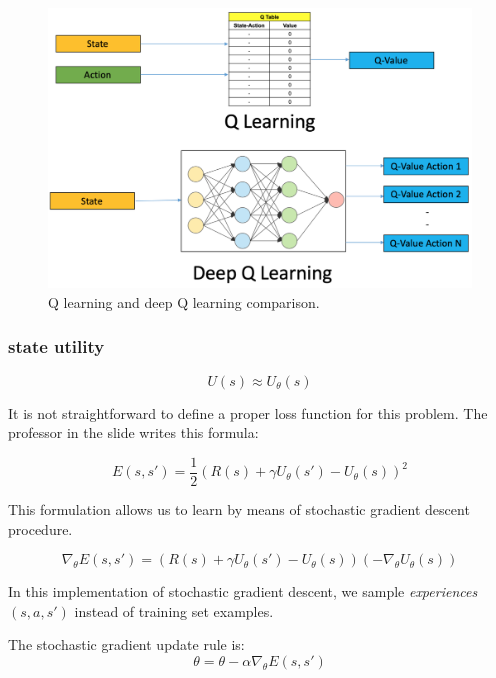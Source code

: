 \begin{figure}[H]
    \centering
    \includegraphics[width=\textwidth]{images/deepQLearning.png}
    \caption{Q learning and deep Q learning comparison.}
    \label{fig:reinforcementLearningDeep}
\end{figure}

\subsubsection{state utility}
\begin{equation}
    U(s) \approx U_\theta(s)
\end{equation}

It is not straightforward to define a proper loss function for this problem. The professor in the slide writes this formula:

\begin{equation}
    E(s,s') = \frac{1}{2} (R(s) + \gamma U_{\theta} (s') - U_{\theta}(s))^2
\end{equation}

This formulation allows us to learn by means of stochastic gradient descent procedure.

\begin{equation}
    \nabla_{\theta} E(s,s') = (R(s) + \gamma U_{\theta} (s') - U_{\theta}(s)) (- \nabla_{\theta}U_{\theta}(s))
\end{equation}

In this implementation of stochastic gradient descent, we sample \textit{experiences} $(s,a,s')$ instead of training set examples.  \newline

The stochastic gradient update rule is:
\begin{equation}
    \theta = \theta - \alpha \nabla_{\theta}E(s, s')
\end{equation}

